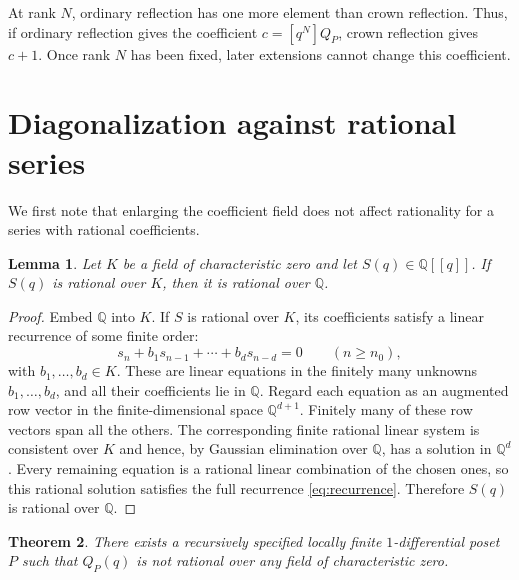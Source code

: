 \documentclass[11pt]{amsart}
\newtheorem{theorem}{Theorem}[section]
\newtheorem{lemma}[theorem]{Lemma}
\theoremstyle{remark}
\newcommand{\Q}{\mathbb{Q}}
\begin{document}
At rank $N$, ordinary reflection has one more element than crown reflection. Thus, if ordinary reflection gives the coefficient $c=[q^N]Q_P$, crown reflection gives $c+1$. Once rank $N$ has been fixed, later extensions cannot change this coefficient.

\section{Diagonalization against rational series}

We first note that enlarging the coefficient field does not affect rationality for a series with rational coefficients.

\begin{lemma}\label{lem:field}
Let $K$ be a field of characteristic zero and let $S(q)\in\Q[[q]]$. If $S(q)$ is rational over $K$, then it is rational over $\Q$.
\end{lemma}

\begin{proof}
Embed $\Q$ into $K$. If $S$ is rational over $K$, its coefficients satisfy a linear recurrence of some finite order:
\begin{equation}
s_n+b_1s_{n-1}+\cdots+b_ds_{n-d}=0
\qquad (n\geq n_0),
\label{eq:recurrence}
\end{equation}
with $b_1,\ldots,b_d\in K$. These are linear equations in the finitely many unknowns $b_1,\ldots,b_d$, and all their coefficients lie in $\Q$. Regard each equation as an augmented row vector in the finite-dimensional space $\Q^{d+1}$. Finitely many of these row vectors span all the others. The corresponding finite rational linear system is consistent over $K$ and hence, by Gaussian elimination over $\Q$, has a solution in $\Q^d$. Every remaining equation is a rational linear combination of the chosen ones, so this rational solution satisfies the full recurrence \eqref{eq:recurrence}. Therefore $S(q)$ is rational over $\Q$.
\end{proof}

\begin{theorem}\label{thm:construction}
There exists a recursively specified locally finite $1$-differential poset $P$ such that $Q_P(q)$ is not rational over any field of characteristic zero.
\end{theorem}
\end{document}
